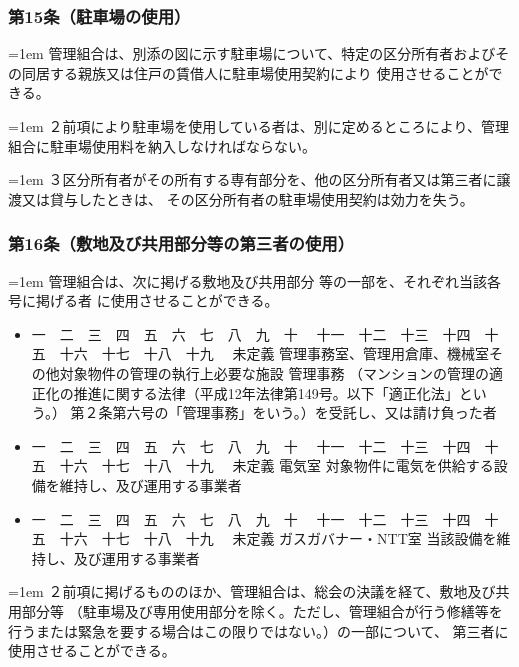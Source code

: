 \documentclass[
  luatex,
  paper=a4paper,
  fontsize=11pt,
  jafontsize=11pt,
  jlreq_notes,
]{jlreq}
\newcommand{\joumain}[1]{%
  \noindent\hangindent=1em\hangafter=1
  \hspace{1em}#1%
}
\newcommand{\kou}[2]{%
  \par\noindent\hangindent=1em\hangafter=1
  #1\hspace{1em}#2%
}
\def\toKansuji#1{
  \tempvls=#1
  \ifcase\tempvls
    \or 一　\or 二　\or 三　\or 四　\or 五　\or 六　\or 七　\or 八　\or 九　\or 十　
    \or 十一　\or 十二　\or 十三　\or 十四　\or 十五　\or 十六　\or 十七　\or 十八　\or 十九　
  \else 未定義
  \fi
}
\begin{document}
  \subsubsection*{第15条（駐車場の使用）}
  \joumain{管理組合は、別添の図に示す駐車場について、特定の区分所有者およびその同居する親族又は住戸の賃借人に駐車場使用契約により
  使用させることができる。}
  \kou{２}{前項により駐車場を使用している者は、別に定めるところにより、管理組合に駐車場使用料を納入しなければならない。}
  \kou{３}{区分所有者がその所有する専有部分を、他の区分所有者又は第三者に譲渡又は貸与したときは、 その区分所有者の駐車場使用契約は効力を失う。}

  \subsubsection*{第16条（敷地及び共用部分等の第三者の使用）}
  \joumain{管理組合は、次に掲げる敷地及び共用部分 等の一部を、それぞれ当該各号に掲げる者 に使用させることができる。}
  \begin{itemize}[label={}, leftmargin=3em, itemindent=-2em]
    \item \toKansuji{1}管理事務室、管理用倉庫、機械室その他対象物件の管理の執行上必要な施設 管理事務
      （マンションの管理の適正化の推進に関する法律（平成12年法律第149号。以下「適正化法」という。）
      第２条第六号の「管理事務」をいう。）を受託し、又は請け負った者
    \item \toKansuji{2}電気室 対象物件に電気を供給する設備を維持し、及び運用する事業者
    \item \toKansuji{3}ガスガバナー・NTT室 当該設備を維持し、及び運用する事業者
  \end{itemize}
  \kou{２}{前項に掲げるもののほか、管理組合は、総会の決議を経て、敷地及び共用部分等
  （駐車場及び専用使用部分を除く。ただし、管理組合が行う修繕等を行うまたは緊急を要する場合はこの限りではない。）の一部について、
  第三者に使用させることができる。}
\end{document}
